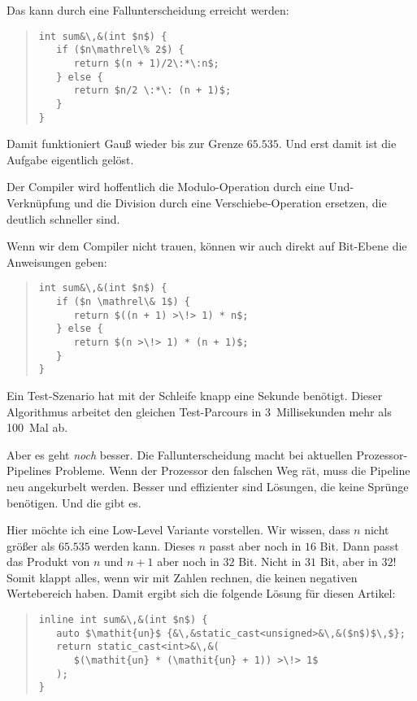 \documentclass[a5paper,landscape,ngerman,10pt]{article}
\begin{document}
Das kann durch eine Fallunterscheidung erreicht werden:

\begin{quotation}
\begin{lstlisting}
int sum&\,&(int $n$) {
   if ($n\mathrel\% 2$) {
      return $(n + 1)/2\:*\:n$;
   } else {
      return $n/2 \:*\: (n + 1)$;
   }
}
\end{lstlisting}
\end{quotation}

Damit funktioniert Gauß wieder bis zur Grenze $65.535$.
Und erst damit ist die Aufgabe eigentlich gelöst.

Der Compiler wird hoffentlich die Modulo-Operation durch eine
Und-Verknüpfung und die Division durch eine
Verschiebe-Operation ersetzen, die deutlich schneller sind.

Wenn wir dem Compiler nicht trauen, können wir auch direkt
auf Bit-Ebene die Anweisungen geben:

\begin{quotation}
\begin{lstlisting}
int sum&\,&(int $n$) {
   if ($n \mathrel\& 1$) {
      return $((n + 1) >\!> 1) * n$;
   } else {
      return $(n >\!> 1) * (n + 1)$;
   }
}
\end{lstlisting}
\end{quotation}

Ein Test-Szenario hat mit der Schleife knapp eine Sekunde benötigt.
Dieser Algorithmus arbeitet den gleichen Test-Parcours in 3~Millisekunden
mehr als 100~Mal ab.

Aber es geht \textit{noch\/} besser.
Die Fallunterscheidung macht bei aktuellen Prozessor-Pipelines
Probleme.
Wenn der Prozessor den falschen Weg rät, muss die
Pipeline neu angekurbelt werden.
Besser und effizienter sind Lösungen, die keine
Sprünge benötigen.
Und die gibt es.

Hier möchte ich eine Low-Level Variante vorstellen.
Wir wissen, dass $n$ nicht größer als $65.535$ werden
kann.
Dieses $n$ passt aber noch in $16$ Bit.
Dann passt das Produkt von $n$ und $n+1$ aber noch in
$32$ Bit.
Nicht in $31$ Bit, aber in $32$!
Somit klappt alles, wenn wir mit Zahlen rechnen, die
keinen negativen Wertebereich haben.
Damit ergibt sich die folgende Lösung für diesen Artikel:

\begin{quotation}
\begin{lstlisting}[frame=single,linewidth=6.1cm]
inline int sum&\,&(int $n$) {
   auto $\mathit{un}$ {&\,&static_cast<unsigned>&\,&($n$)$\,$};
   return static_cast<int>&\,&(
      $(\mathit{un} * (\mathit{un} + 1)) >\!> 1$
   );
}
\end{lstlisting}
\end{quotation}
\end{document}
